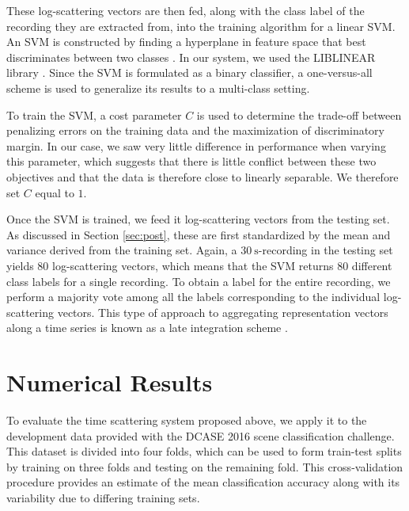 \documentclass{article}
\begin{document}
\begin{sloppy}
These log-scattering vectors are then fed, along with the class label of the recording they are extracted from, into the training algorithm for a linear SVM. An SVM is constructed by finding a hyperplane in feature space that best discriminates between two classes \cite{vapnik}. In our system, we used the LIBLINEAR library \cite{liblinear}. Since the SVM is formulated as a binary classifier, a one-versus-all scheme is used to generalize its results to a multi-class setting.

To train the SVM, a cost parameter $C$ is used to determine the trade-off between penalizing errors on the training data and the maximization of discriminatory margin. In our case, we saw very little difference in performance when varying this parameter, which suggests that there is little conflict between these two objectives and that the data is therefore close to linearly separable. We therefore set $C$ equal to $1$.

Once the SVM is trained, we feed it log-scattering vectors from the testing set. As discussed in Section \ref{sec:post}, these are first standardized by the mean and variance derived from the training set. Again, a $30~\mathrm{s}$-recording in the testing set yields $80$ log-scattering vectors, which means that the SVM returns $80$ different class labels for a single recording. To obtain a label for the entire recording, we perform a majority vote among all the labels corresponding to the individual log-scattering vectors. This type of approach to aggregating representation vectors along a time series is known as a late integration scheme \cite{kittler}.

\section{Numerical Results}
\label{sec:results}

To evaluate the time scattering system proposed above, we apply it to the development data provided with the DCASE 2016 scene classification challenge. This dataset is divided into four folds, which can be used to form train-test splits by training on three folds and testing on the remaining fold. This cross-validation procedure provides an estimate of the mean classification accuracy along with its variability due to differing training sets.


\end{sloppy}
\end{document}
